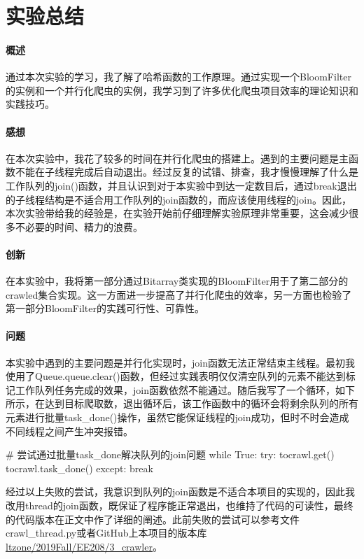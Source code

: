 \documentclass{article}
\begin{document}
\section{实验总结}
\paragraph{概述}
通过本次实验的学习，我了解了哈希函数的工作原理。通过实现一个BloomFilter的实例和一个并行化爬虫的实例，我学习到了许多优化爬虫项目效率的理论知识和实践技巧。

\paragraph{感想}
在本次实验中，我花了较多的时间在并行化爬虫的搭建上。遇到的主要问题是主函数不能在子线程完成后自动退出。经过反复的试错、排查，我才慢慢理解了什么是工作队列的join()函数，并且认识到对于本实验中到达一定数目后，通过break退出的子线程结构是不适合用工作队列的join函数的，而应该使用线程的join。因此，本次实验带给我的经验是，在实验开始前仔细理解实验原理非常重要，这会减少很多不必要的时间、精力的浪费。

\paragraph{创新}
在本实验中，我将第一部分通过Bitarray类实现的BloomFilter用于了第二部分的crawled集合实现。这一方面进一步提高了并行化爬虫的效率，另一方面也检验了第一部分BloomFilter的实践可行性、可靠性。


\paragraph{问题}
本实验中遇到的主要问题是并行化实现时，join函数无法正常结束主线程。最初我使用了Queue.queue.clear()函数，但经过实践表明仅仅清空队列的元素不能达到标记工作队列任务完成的效果，join函数依然不能通过。随后我写了一个循环，如下所示，在达到目标爬取数，退出循环后，该工作函数中的循环会将剩余队列的所有元素进行批量task\_done()操作，虽然它能保证线程的join成功，但时不时会造成不同线程之间产生冲突报错。

\begin{python}
# 尝试通过批量task_done解决队列的join问题
while True:
    try:
        tocrawl.get()
        tocrawl.task_done()
    except:
        break
\end{python}

经过以上失败的尝试，我意识到队列的join函数是不适合本项目的实现的，因此我改用thread的join函数，既保证了程序能正常退出，也维持了代码的可读性，最终的代码版本在正文中作了详细的阐述。此前失败的尝试可以参考文件crawl\_thread.py或者GitHub上本项目的版本库\href{https://github.com/ltzone/2019Fall/tree/dev/EE208/3_crawler}{\underline{ltzone/2019Fall/EE208/3\_crawler}}。
\end{document}
